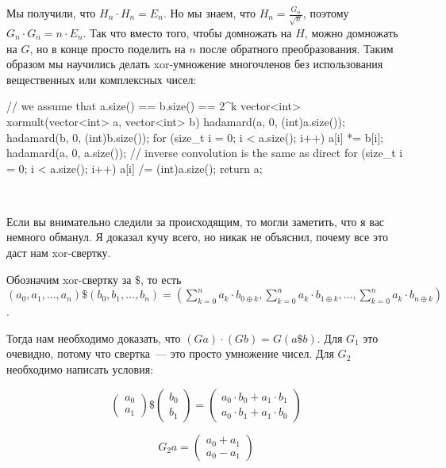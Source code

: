 Мы получили, что $H_n \cdot H_n = E_n$.
Но мы знаем, что $H_n = \frac{G_n}{\sqrt{n}}$,
поэтому $G_n \cdot G_n = n \cdot E_n$.
Так что вместо того, чтобы домножать на $H$, можно домножать на $G$,
но в конце просто поделить на $n$ после обратного преобразования. Таким образом мы научились делать xor-умножение многочленов
без использования вещественных или комплексных чисел:

\begin{code}
// we assume that a.size() == b.size() == 2^k
vector<int> xormult(vector<int> a, vector<int> b) {
    hadamard(a, 0, (int)a.size());
    hadamard(b, 0, (int)b.size());
    for (size_t i = 0; i < a.size(); i++) {
        a[i] *= b[i];
    }
    hadamard(a, 0, a.size()); // inverse convolution is the same as direct
    for (size_t i = 0; i < a.size(); i++) {
        a[i] /= (int)a.size();
    }
    return a;
}

\end{code}

\

Если вы внимательно следили за происходящим, то могли заметить, что я вас немного обманул.
Я доказал кучу всего, но никак не объяснил, почему все это даст нам xor-свертку.

Обозначим xor-свертку за $\$$, то есть
$(a_0, a_1, \ldots, a_n) \$ (b_0, b_1, \ldots, b_n) = 
(\sum \limits_{k = 0}^{n} a_k \cdot b_{0 \oplus k}, \sum \limits_{k = 0}^{n} a_k \cdot b_{1 \oplus k},
\ldots, \sum \limits_{k = 0}^{n} a_k \cdot b_{n \oplus k})$.

Тогда нам необходимо доказать, что $(Ga) \cdot (Gb) = G (a \$ b)$.
Для $G_1$ это очевидно, потому что свертка~--- это просто умножение чисел.
Для $G_2$ необходимо написать условия:

$$\begin{pmatrix}
a_0\\
a_1
\end{pmatrix}
\$ 
\begin{pmatrix}
b_0\\
b_1
\end{pmatrix}
=
\begin{pmatrix}
a_0 \cdot b_0 + a_1 \cdot b_1\\
a_0 \cdot b_1 + a_1 \cdot b_0
\end{pmatrix}
$$

$$G_2a = 
\begin{pmatrix}
a_0 + a_1\\
a_0 - a_1
\end{pmatrix}
$$

